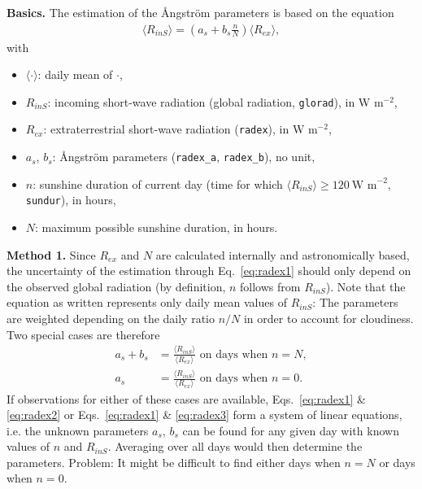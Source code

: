 \documentclass{scrreprt}
\newenvironment{denseitem}{
  \begin{itemize}
    \setlength{\itemsep}{0pt}
    \setlength{\parskip}{0pt}
    \setlength{\parsep}{0pt}
}{
  \end{itemize}
}
\begin{document}
\textbf{Basics.}
The estimation of the {\AA}ngstr\"om parameters is based on the equation
\begin{align} \label{eq:radex1}
  \langle R_{inS} \rangle = \left (  a_s + b_s \frac{n}{N} \right ) \langle R_{ex} \rangle,
\end{align}
%
with
\begin{denseitem}
  \item[] $\langle \cdot \rangle$: daily mean of $\cdot$,
  \item[] $R_{inS}$: incoming short-wave radiation (global radiation, \verb!glorad!), in W m$^{-2}$,
  \item[] $R_{ex}$: extraterrestrial short-wave radiation (\verb!radex!), in W m$^{-2}$,
  \item[] $a_s$, $b_s$: {\AA}ngstr\"om parameters (\verb!radex_a!, \verb!radex_b!), no unit,
  \item[] $n$: sunshine duration of current day (time for which $\langle R_{inS} \rangle \geq 120~\text{W~m}^{-2}$, \verb!sundur!), in hours,
  \item[] $N$: maximum possible sunshine duration, in hours.
\end{denseitem}

\textbf{Method 1.}
Since $R_{ex}$ and $N$ are calculated internally and astronomically based, the uncertainty of the estimation through Eq.~\eqref{eq:radex1} should only depend on the observed global radiation (by definition, $n$ follows from $R_{inS}$).
Note that the equation as written represents only daily mean values of $R_{inS}$:
The parameters are weighted depending on the daily ratio $n/N$ in order to account for cloudiness.
Two special cases are therefore
\begin{align}
  a_s + b_s &= \frac{\langle R_{inS} \rangle}{\langle R_{ex} \rangle} \text{ on days when } n=N, \label{eq:radex2} \\
  a_s &= \frac{\langle R_{inS} \rangle}{\langle R_{ex} \rangle} \text{ on days when } n=0. \label{eq:radex3}
\end{align}
%
If observations for either of these cases are available, Eqs.~\eqref{eq:radex1} \& \eqref{eq:radex2} or Eqs.~\eqref{eq:radex1} \& \eqref{eq:radex3} form a system of linear equations, i.e. the unknown parameters $a_s$, $b_s$ can be found for any given day with known values of $n$ and $R_{inS}$.
Averaging over all days would then determine the parameters.
Problem: It might be difficult to find either days when $n=N$ or days when $n=0$.
\end{document}
